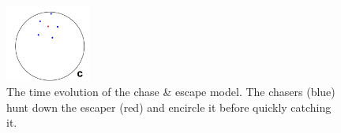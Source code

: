 \documentclass[%
11pt,
amsmath, amssymb,
aps,
pra
]{revtex4-2}
\newcommand{\threeImageSpacing}{0.25\textwidth}
\begin{document}
\begin{figure}[tb]
    \includegraphics[width=\threeImageSpacing]{images/chaseescape/2.png}
    \caption{The time evolution of the chase \& escape model. The chasers (blue) hunt down the escaper (red) and encircle
    it before quickly catching it.}
    \label{fig:chaseescape}
\end{figure}
\newpage
\end{document}
